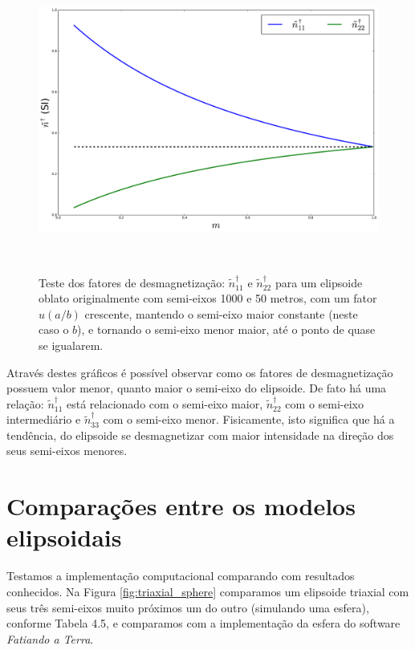 \begin{figure}[hbt!]
	\centering \includegraphics[width=15cm,height=10cm]{figures/test_n_oblate}
	\caption[Teste dos fatores de desmagnetização para um elipsoide oblato.]{Teste dos fatores de desmagnetização:
		$\tilde{n}^{\dagger}_{11}$ e $\tilde{n}^{\dagger}_{22}$
		para um elipsoide oblato originalmente com semi-eixos 1000 e 50 metros, com um fator $u (a/b)$ crescente,
		mantendo o semi-eixo maior constante (neste caso o $b$), e tornando o semi-eixo menor maior, até o ponto de
		quase se igualarem.}
	\label{fig:n_oblato}
\end{figure}

Através destes gráficos é possível observar como os fatores de desmagnetização possuem valor menor, quanto maior o semi-eixo do elipsoide. De fato há uma relação: $\tilde{n}^{\dagger}_{11}$ está relacionado com o semi-eixo maior, $\tilde{n}^{\dagger}_{22}$ com o semi-eixo intermediário e $\tilde{n}^{\dagger}_{33}$ com o semi-eixo menor. Fisicamente, isto significa que há a tendência, do elipsoide se desmagnetizar com maior intensidade na direção dos seus semi-eixos menores.

\section{Comparações entre os modelos elipsoidais}

Testamos a implementação computacional comparando com resultados conhecidos. Na Figura \ref{fig:triaxial_sphere} comparamos um elipsoide triaxial com seus três semi-eixos muito próximos um do outro (simulando uma esfera), conforme Tabela 4.5, e comparamos com a implementação da esfera do software \textit{Fatiando a Terra}.
\newpage

